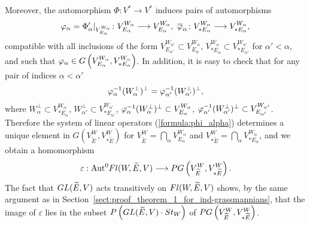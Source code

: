 \documentclass[11pt, a4paper]{article}
\begin{document}
Moreover, the automorphism $\Phi:V^*\rightarrow V^*$ induces pairs of automorphisms \begin{equation}
    \vfi_{\alpha}=\Phi'_{\alpha}|_{V^{W_{\alpha}}_{E_{\alpha}}}\colon V^{W_{\alpha}}_{E_{\alpha}}\longrightarrow\label{formula:phi_alpha} V^{W_{\alpha}}_{E_{\alpha}},~%
    \overline{\vfi}_{\alpha}\colon V^{W_{\alpha}}_{*E_{\alpha}}\longrightarrow V^{W_{\alpha}}_{*E_{\alpha}},
\end{equation}
compatible with all inclusions of the form $V^{W_{\alpha'}}_{E_{\alpha'}}\subset V^{W_{\alpha}}_{E_{\alpha}}$, $V^{W_{\alpha}}_{*E_{\alpha}}\subset V^{W_{\alpha'}}_{*E_{\alpha'}}$  for $\alpha'<\alpha$, and such that $\vfi_{\alpha}%
\in  G\left(V^{W_{\alpha}}_{E_{\alpha}},V^{W_{\alpha}}_{*E_{\alpha}}\right)$. In addition, it is easy to check that for any pair of indices $\alpha<\alpha'$
\begin{equation*}
\varphi_{\alpha}^{-1}(W_{\alpha}^{\perp})^{\perp}=\varphi_{\alpha'}^{-1}(W_{\alpha'}^{\perp})^{\perp},
\end{equation*}
where $W_{\alpha}^{\perp}\subset V^{W_{\alpha}}_{*E_{\alpha}}$, $W_{\alpha'}^{\perp}\subset V^{W_{\alpha'}}_{*E_{\alpha'}}$, $\varphi_{\alpha}^{-1}(W_{\alpha}^{\perp})^{\perp}\subset V^{W_{\alpha}}_{E_{\alpha}}$, $\varphi_{\alpha'}^{-1}(W_{\alpha'}^{\perp})^{\perp}\subset V^{W_{\alpha'}}_{E_{\alpha'}}$. Therefore the system of linear operators (\ref{formula:phi_alpha}) determines a unique element in $ G\left( V^W_{\widetilde{E}}, V^W_{*\widetilde{E}}\right)$
for $V^W_{\widetilde{E}}=\bigcap \limits_{\alpha}V^{W_{\alpha}}_{E_{\alpha}}$ and $V^W_{*\widetilde{E}}=\bigcap \limits_{\alpha}V^{W_{\alpha}}_{*E_{\alpha}}$, and we obtain a homomorphism \begin{equation*}
\varepsilon:\mathrm{Aut}^0 Fl(W,\widetilde{E},V) \longrightarrow P G\left(V^W_{\widetilde{E}},V^W_{*\widetilde{E}}\right).
\end{equation*}
The fact that $GL(\widetilde{E},V)$ acts transitively on $Fl(W,\widetilde{E},V)$ shows, by the same argument as in Section~\ref{sect:proof_theorem_1_for_ind-grassmannians}, that the image of $\varepsilon$ lies in the subset $P\left(GL(\widetilde{E},V)\cdot St_W\right)$ of $P G\left(V^W_{\widetilde{E}}, V^W_{*\widetilde{E}}\right)$.
\end{document}
